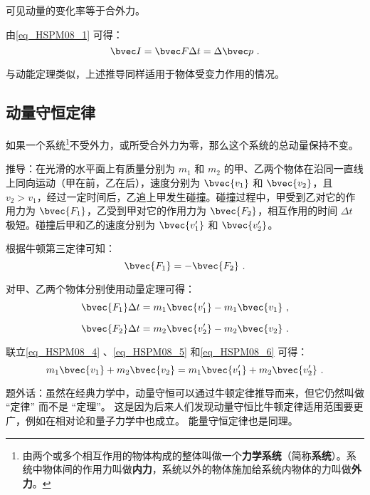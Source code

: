 可见动量的变化率等于合外力。

由\autoref{eq_HSPM08_1} 可得：
\begin{equation}\label{eq_HSPM08_3}
\bvec I=\bvec F\Delta t=\Delta \bvec p~.
\end{equation}

与动能定理类似，上述推导同样适用于物体受变力作用的情况。

\subsection{动量守恒定律}

如果一个系统\footnote{由两个或多个相互作用的物体构成的整体叫做一个\textbf{力学系统}（简称\textbf{系统}）。系统中物体间的作用力叫做\textbf{内力}，系统以外的物体施加给系统内物体的力叫做\textbf{外力}。}不受外力，或所受合外力为零，那么这个系统的总动量保持不变。

推导：在光滑的水平面上有质量分别为 $m_1$ 和 $m_2$ 的甲、乙两个物体在沿同一直线上同向运动（甲在前，乙在后），速度分别为 $\bvec{v_1}$ 和 $\bvec{v_2}$，且 $v_2>v_1$，经过一定时间后，乙追上甲发生碰撞。碰撞过程中，甲受到乙对它的作用力为 $\bvec {F_1}$，乙受到甲对它的作用力为 $\bvec {F_2}$，相互作用的时间 $\Delta t$ 极短。碰撞后甲和乙的速度分别为 $\bvec{v_1'}$ 和 $\bvec{v_2'}$。

根据牛顿第三定律可知：
\begin{equation}\label{eq_HSPM08_4}
\bvec {F_1}=-\bvec{F_2}~.
\end{equation}

对甲、乙两个物体分别使用动量定理可得：
\begin{equation}\label{eq_HSPM08_5}
\bvec{F_1}\Delta t=m_1\bvec{v_1'}-m_1\bvec{v_1}~,
\end{equation}

\begin{equation}\label{eq_HSPM08_6}
\bvec{F_2}\Delta t=m_2\bvec{v_2'}-m_2\bvec{v_2}~.
\end{equation}

联立\autoref{eq_HSPM08_4} 、\autoref{eq_HSPM08_5} 和\autoref{eq_HSPM08_6} 可得：
\begin{equation}
m_1\bvec{v_1}+ m_2\bvec{v_2}= m_1\bvec{v_1'}+ m_2\bvec{v_2'}~.
\end{equation}

题外话：虽然在经典力学中，动量守恒可以通过牛顿定律推导而来，但它仍然叫做 “定律” 而不是 “定理”。 这是因为后来人们发现动量守恒比牛顿定律适用范围要更广，例如在相对论和量子力学中也成立。 能量守恒定律也是同理。

